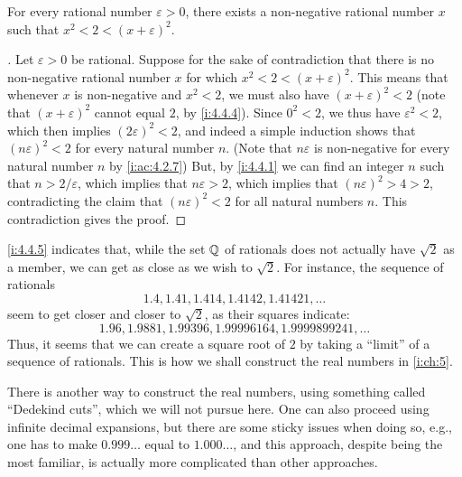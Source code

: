 \begin{prop}\label{i:4.4.5}
  For every rational number \(\varepsilon > 0\), there exists a non-negative rational number \(x\) such that \(x^2 < 2 < (x + \varepsilon)^2\).
\end{prop}

\begin{proof}[]
  Let \(\varepsilon > 0\) be rational.
  Suppose for the sake of contradiction that there is no non-negative rational number \(x\) for which \(x^2 < 2 < (x + \varepsilon)^2\).
  This means that whenever \(x\) is non-negative and \(x^2 < 2\), we must also have \((x + \varepsilon)^2 < 2\)
  (note that \((x + \varepsilon)^2\) cannot equal \(2\), by \cref{i:4.4.4}).
  Since \(0^2 < 2\), we thus have \(\varepsilon^2 < 2\), which then implies \((2\varepsilon)^2 < 2\), and indeed a simple induction shows that \((n\varepsilon)^2 < 2\) for every natural number \(n\).
  (Note that \(n\varepsilon\) is non-negative for every natural number \(n\) by \cref{i:ac:4.2.7})
  But, by \cref{i:4.4.1} we can find an integer \(n\) such that \(n > 2 / \varepsilon\), which implies that \(n\varepsilon > 2\), which implies that \((n\varepsilon)^2 > 4 > 2\), contradicting the claim that \((n\varepsilon)^2 < 2\) for all natural numbers \(n\).
  This contradiction gives the proof.
\end{proof}

\begin{note}
  \cref{i:4.4.5} indicates that, while the set \(\mathbb{Q}\) of rationals does not actually have \(\sqrt{2}\) as a member, we can get as close as we wish to \(\sqrt{2}\).
  For instance, the sequence of rationals
  \[
    1.4, 1.41, 1.414, 1.4142, 1.41421, \dots
  \]
  seem to get closer and closer to \(\sqrt{2}\), as their squares indicate:
  \[
    1.96, 1.9881, 1.99396, 1.99996164, 1.9999899241, \dots
  \]
  Thus, it seems that we can create a square root of \(2\) by taking a ``limit'' of a sequence of rationals.
  This is how we shall construct the real numbers in \cref{i:ch:5}.
\end{note}

\begin{note}
  There is another way to construct the real numbers, using something called ``Dedekind cuts'', which we will not pursue here.
  One can also proceed using infinite decimal expansions, but there are some sticky issues when doing so, e.g., one has to make \(0.999\dots\) equal to \(1.000\dots\), and this approach, despite being the most familiar, is actually more complicated than other approaches.
\end{note}


